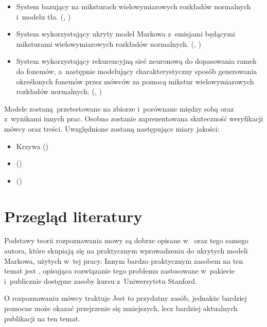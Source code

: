 \begin{itemize}
    \item System bazujący na miksturach wielowymiarowych rozkładów normalnych i~modelu tła. (, )
    \item System wykorzystujący ukryty model Markowa z~emisjami będącymi miksturami wielowymiarowych rozkładów normalnych. (, )
    \item System wykorzystujący rekurencyjną sieć neuronową do dopasowania ramek do fonemów, a~następnie modelujący charakterystyczny sposób generowania określonych fonemów przez mówców za pomocą mikstur wielowymiarowych rozkładów normalnych. (, )
\end{itemize}

Modele zostaną przetestowane na zbiorze  i~porównane między sobą oraz z~wynikami innych prac.
Osobno zostanie zaprezentowana skuteczność weryfikacji mówcy oraz treści. Uwzględnione zostaną następujące miary jakości:

\begin{itemize}
    \item Krzywa  ()
    \item {} ()
    \item {} ()
\end{itemize}

\section{Przegląd literatury}\label{sec:przeglad_literatury}

Podstawy teorii rozpoznawania mowy są dobrze opisane w~\cite{fundamentalsOfSpeech}
oraz \cite{aTutorialOnHidden} tego samego autora, które skupiają się na praktycznym wprowadzeniu
do ukrytych modeli Markowa, użytych w~tej pracy.
Innym bardzo praktycznym zasobem na ten temat jest \cite{theHtkBook}, opisująca rozwiązanie
tego problemu zastosowane w~pakiecie  i~publicznie dostępne zasoby
kursu  z~Uniwersytetu Stanford.

O rozpoznawaniu mówcy traktuje \cite{fundamentalsOfSpeaker}
Jest to przydatny zasób, jednakże bardziej pomocne może okazać przejrzenie się mniejszych, lecz
bardziej aktualnych publikacji na ten temat.

